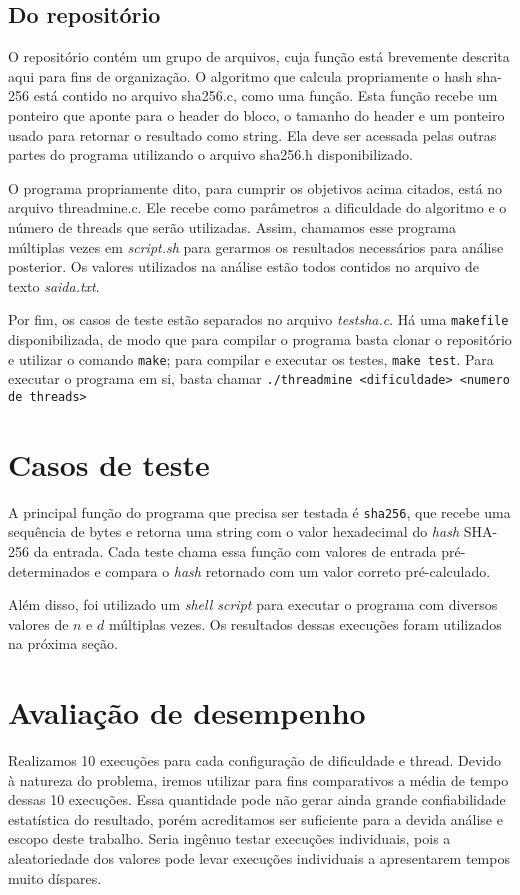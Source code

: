 \documentclass[12pt]{article}
\begin{document}
\subsection{Do repositório}
O repositório contém um grupo de arquivos,
cuja função está brevemente descrita aqui para fins de organização.
O algoritmo que calcula propriamente o hash sha-256 está contido no arquivo \textmd{sha256.c}, como uma função.
Esta função recebe um ponteiro que aponte para o header do bloco, o tamanho do header e um ponteiro usado para retornar o resultado como string.
Ela deve ser acessada pelas outras partes do programa utilizando o arquivo \textmd{sha256.h} disponibilizado.

O programa propriamente dito,
para cumprir os objetivos acima citados,
está no arquivo \textmd{threadmine.c}.
Ele recebe como parâmetros a dificuldade do algoritmo
e o número de threads que serão utilizadas.
Assim, chamamos esse programa múltiplas vezes
em \textsl{script.sh} para gerarmos os resultados
necessários para análise posterior.
Os valores utilizados na análise estão todos contidos
no arquivo de texto \textsl{saida.txt}.

Por fim, os casos de teste estão separados no arquivo \textsl{testsha.c}. Há uma \texttt{makefile} disponibilizada, de modo que para compilar o programa basta clonar o repositório e utilizar o comando \texttt{make}; para compilar e executar os testes, \texttt{make test}. Para executar o programa em si, basta chamar \texttt{./threadmine <dificuldade> <numero de threads>}

\section{Casos de teste}
A principal função do programa que
precisa ser testada é \texttt{sha256},
que recebe uma sequência de bytes e
retorna uma string com o valor hexadecimal
do \textit{hash} SHA-256 da entrada.
Cada teste chama essa função com
valores de entrada pré-determinados e
compara o \textit{hash} retornado
com um valor correto pré-calculado.

Além disso, foi utilizado um \textit{shell script}
para executar o programa com
diversos valores de $n$ e $d$ múltiplas vezes.
Os resultados dessas execuções
foram utilizados na próxima seção.

\newpage
\section{Avaliação de desempenho}
Realizamos 10 execuções para cada configuração de dificuldade e thread.
Devido à natureza do problema,
iremos utilizar para fins comparativos
a média de tempo dessas 10 execuções.
Essa quantidade pode não gerar ainda
grande confiabilidade estatística do resultado,
porém acreditamos ser suficiente
para a devida análise e escopo deste trabalho.
Seria ingênuo testar execuções individuais,
pois a aleatoriedade dos valores pode levar
execuções individuais a apresentarem tempos muito díspares.
\end{document}
